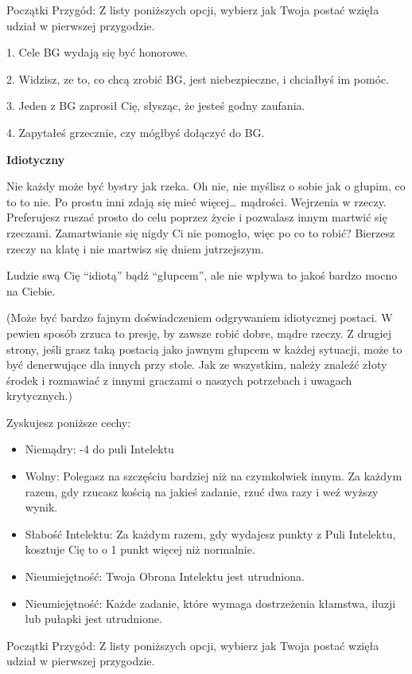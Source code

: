 Początki Przygód: Z listy poniższych opcji, wybierz jak Twoja postać wzięła udział w pierwszej przygodzie.

1. Cele BG wydają się być honorowe.

2. Widzisz, ze to, co chcą zrobić BG, jest niebezpieczne, i chciałbyś im pomóc.

3. Jeden z BG zaprosił Cię, słysząc, że jesteś godny zaufania.

4. Zapytałeś grzecznie, czy mógłbyś dołączyć do BG.

\textbf{Idiotyczny}

Nie każdy może być bystry jak rzeka.  Oh nie, nie myślisz o sobie jak o głupim, co to to nie. Po prostu inni zdają się mieć więcej… mądrości. Wejrzenia w rzeczy. Preferujesz ruszać prosto do celu poprzez życie i pozwalasz innym martwić się rzeczami. Zamartwianie się nigdy Ci nie pomogło, więc po co to robić? Bierzesz rzeczy na klatę i nie martwisz się dniem jutrzejszym.

Ludzie swą Cię “idiotą” bądź “głupcem”, ale nie wpływa to jakoś bardzo mocno na Ciebie. 

(Może być bardzo fajnym doświadczeniem odgrywaniem idiotycznej postaci. W pewien sposób zrzuca to presję, by zawsze robić dobre, mądre rzeczy. Z drugiej strony, jeśli grasz taką postacią jako jawnym głupcem w każdej sytuacji, może to być denerwujące dla innych przy stole. Jak ze wszystkim, należy znaleźć złoty środek i rozmawiać z innymi graczami o naszych potrzebach i uwagach krytycznych.)

Zyskujesz poniższe cechy:
\begin{itemize} 
\item Niemądry: -4 do puli Intelektu
\item Wolny: Polegasz na szczęściu bardziej niż na czymkolwiek innym. Za każdym razem, gdy rzucasz kością na jakieś zadanie, rzuć dwa razy i weź wyższy wynik.
\item  Słabość Intelektu: Za każdym razem, gdy wydajesz punkty z Puli Intelektu, kosztuje Cię to o 1 punkt więcej niż normalnie.
\item Nieumiejętność: Twoja Obrona Intelektu jest utrudniona.
\item Nieumiejętność: Każde zadanie, które wymaga dostrzeżenia kłamstwa, iluzji lub pułapki jest utrudnione.
\end{itemize}

Początki Przygód: Z listy poniższych opcji, wybierz jak Twoja postać wzięła udział w pierwszej przygodzie.


